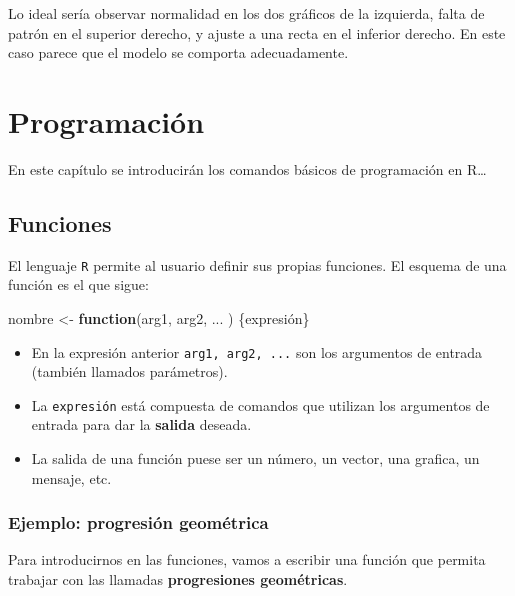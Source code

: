 \documentclass[
]{book}
\newenvironment{Shaded}{\begin{snugshade}}{\end{snugshade}}
\newcommand{\ControlFlowTok}[1]{\textcolor[rgb]{0.13,0.29,0.53}{\textbf{#1}}}
\newcommand{\NormalTok}[1]{#1}
\newcommand{\OtherTok}[1]{\textcolor[rgb]{0.56,0.35,0.01}{#1}}
\theoremstyle{break}
\begin{document}
Lo ideal sería observar normalidad en los dos gráficos de la izquierda, falta de patrón en el superior derecho, y ajuste a una recta en el inferior derecho. En este caso parece que el modelo se comporta adecuadamente.

\hypertarget{programacion}{%
\chapter{Programación}\label{programacion}}

En este capítulo se introducirán los comandos básicos de programación en R\ldots{}

\hypertarget{funciones}{%
\section{Funciones}\label{funciones}}

El lenguaje \texttt{R} permite al usuario
definir sus propias funciones. El esquema de una función es el que
sigue:

\begin{Shaded}
\begin{Highlighting}[]
\NormalTok{nombre }\OtherTok{\textless{}{-}} \ControlFlowTok{function}\NormalTok{(arg1, arg2, ... ) \{expresión\}}
\end{Highlighting}
\end{Shaded}

\begin{itemize}
\item
  En la expresión anterior \texttt{arg1,\ arg2,\ ...} son los
  argumentos de entrada (también llamados parámetros).
\item
  La \texttt{expresión} está compuesta de comandos que utilizan los
  argumentos de entrada para dar la \textbf{salida} deseada.
\item
  La salida de una función puese ser un número, un vector, una
  grafica, un mensaje, etc.
\end{itemize}

\hypertarget{ejemplo-progresiuxf3n-geomuxe9trica}{%
\subsection{Ejemplo: progresión geométrica}\label{ejemplo-progresiuxf3n-geomuxe9trica}}

Para introducirnos en las
funciones, vamos a escribir una función que permita trabajar con las
llamadas \textbf{progresiones geométricas}.
\end{document}
